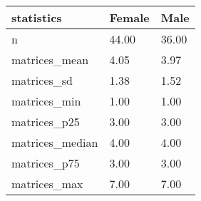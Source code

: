 
\begin{tabular}{l|l|l}
\hline
statistics & Female & Male\\
\hline
n & 44.00 & 36.00\\
\hline
matrices\_mean & 4.05 & 3.97\\
\hline
matrices\_sd & 1.38 & 1.52\\
\hline
matrices\_min & 1.00 & 1.00\\
\hline
matrices\_p25 & 3.00 & 3.00\\
\hline
matrices\_median & 4.00 & 4.00\\
\hline
matrices\_p75 & 3.00 & 3.00\\
\hline
matrices\_max & 7.00 & 7.00\\
\hline
\end{tabular}
